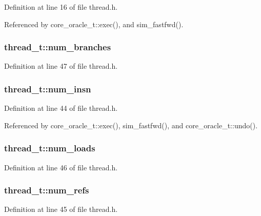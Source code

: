 Definition at line 16 of file thread.h.

Referenced by core\_\-oracle\_\-t::exec(), and sim\_\-fastfwd().
\subsubsection[{num\_\-branches}]{ {\bf thread\_\-t::num\_\-branches}}\label{structthread__t_48a033989c53df8b551a79be22772a3a}




Definition at line 47 of file thread.h.
\subsubsection[{num\_\-insn}]{ {\bf thread\_\-t::num\_\-insn}}\label{structthread__t_f868fe7453e104d71cbe7cd80248a451}




Definition at line 44 of file thread.h.

Referenced by core\_\-oracle\_\-t::exec(), sim\_\-fastfwd(), and core\_\-oracle\_\-t::undo().
\subsubsection[{num\_\-loads}]{ {\bf thread\_\-t::num\_\-loads}}\label{structthread__t_f169c1f51d54e1d3547b7e4ac24efcbd}




Definition at line 46 of file thread.h.
\subsubsection[{num\_\-refs}]{ {\bf thread\_\-t::num\_\-refs}}\label{structthread__t_732f09c6857f2306c5948129fb77d698}




Definition at line 45 of file thread.h.
